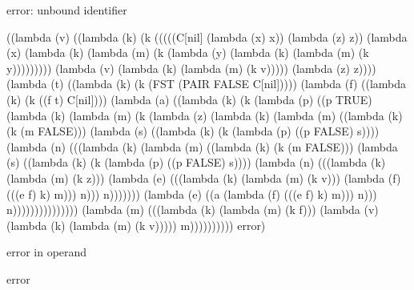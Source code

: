 \documentclass[ms,electronic,twosidetoc,letterpaper,chaptercenter,parttop]{byumsphd}
\begin{document}
\begin{theorem}
error: unbound identifier
\begin{schemedisplay}
((lambda (v) ((lambda (k) (k (((((C[nil] (lambda (x) x)) (lambda (z) z))
                    (lambda (x) (lambda (k) (lambda (m) (k (lambda (y) (lambda (k) (lambda (m) (k y)))))))))
                   (lambda (v) (lambda (k) (lambda (m) (k v))))) (lambda (z) z))))
        (lambda (t) ((lambda (k) (k (FST
                         (PAIR FALSE C[nil]))))
               (lambda (f) ((lambda (k) (k ((f t) C[nil])))
                      (lambda (a) ((lambda (k) (k (lambda (p) ((p TRUE)
                                             (lambda (k) (lambda (m) (k (lambda (z) (lambda (k) (lambda (m) ((lambda (k) (k (m FALSE)))
                                                                               (lambda (s) ((lambda (k) (k (lambda (p) ((p FALSE) s))))
                                                                                      (lambda (n) (((lambda (k) (lambda (m) ((lambda (k) (k (m FALSE)))
                                                                                                           (lambda (s) ((lambda (k) (k (lambda (p) ((p FALSE) s))))
                                                                                                                  (lambda (n) (((lambda (k) (lambda (m) (k z)))
                                                                                                                          (lambda (e) (((lambda (k) (lambda (m) (k v)))
                                                                                                                                  (lambda (f) (((e f) k) m))) n))) n)))))))
                                                                                              (lambda (e) ((a (lambda (f) (((e f) k) m))) n))) n)))))))))))))))
                             (lambda (m) (((lambda (k) (lambda (m) (k f)))
                                     (lambda (v) (lambda (k) (lambda (m) (k v))))) m)))))))))) error)
\end{schemedisplay}

error in operand
\begin{schemedisplay}
error
\end{schemedisplay}





\end{theorem}
\end{document}
